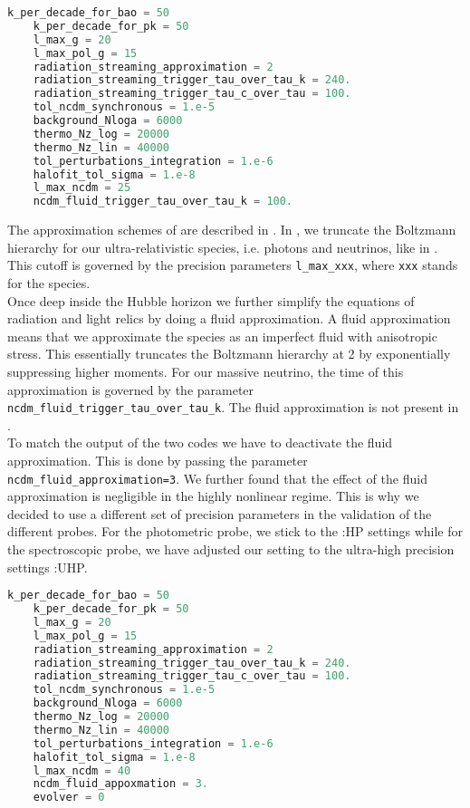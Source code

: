 \documentclass[../main.tex]{subfiles}
\begin{document}
\begin{lstlisting}[language=Python,caption=\class:HP precision settings, label=lst:classHP]
    k_per_decade_for_bao = 50
    k_per_decade_for_pk = 50
    l_max_g = 20
    l_max_pol_g = 15
    radiation_streaming_approximation = 2
    radiation_streaming_trigger_tau_over_tau_k = 240.
    radiation_streaming_trigger_tau_c_over_tau = 100.
    tol_ncdm_synchronous = 1.e-5
    background_Nloga = 6000
    thermo_Nz_log = 20000
    thermo_Nz_lin = 40000
    tol_perturbations_integration = 1.e-6
    halofit_tol_sigma = 1.e-8
    l_max_ncdm = 25
    ncdm_fluid_trigger_tau_over_tau_k = 100.
\end{lstlisting} 
 The approximation schemes of \class are described in \cite{Blas:2011rf}. In \class, we truncate the Boltzmann hierarchy for our ultra-relativistic species, i.e. photons and neutrinos, like in \camb. This cutoff is governed by the precision parameters {\tt l\_max\_xxx}, where {\tt xxx} stands for the species.\\
 Once deep inside the Hubble horizon we further simplify the equations of radiation and light relics by doing a fluid approximation. A fluid approximation means that we approximate the species as an imperfect fluid with anisotropic stress. This essentially truncates the Boltzmann hierarchy at 2 by exponentially suppressing higher moments. For our massive neutrino, the time of this approximation is governed by the parameter {\tt ncdm\_fluid\_trigger\_tau\_over\_tau\_k}.
 The fluid approximation is not present in \camb.\\
  To match the output of the two codes we have to deactivate the fluid approximation. This is done by passing the parameter {\tt ncdm\_fluid\_approximation=3}. We further found that the effect of the fluid approximation is negligible in the highly nonlinear regime. This is why we decided to use a different set of precision parameters in the validation of the different probes. For the photometric probe, we stick to the \class:HP settings while for the spectroscopic probe, we have adjusted our setting to the ultra-high precision settings \class:UHP.
 \begin{lstlisting}[language=Python,caption=\class:UHP precision settings, label=lst:classUHP]
    k_per_decade_for_bao = 50
    k_per_decade_for_pk = 50
    l_max_g = 20
    l_max_pol_g = 15
    radiation_streaming_approximation = 2
    radiation_streaming_trigger_tau_over_tau_k = 240.
    radiation_streaming_trigger_tau_c_over_tau = 100.
    tol_ncdm_synchronous = 1.e-5
    background_Nloga = 6000
    thermo_Nz_log = 20000
    thermo_Nz_lin = 40000
    tol_perturbations_integration = 1.e-6
    halofit_tol_sigma = 1.e-8
    l_max_ncdm = 40
    ncdm_fluid_appoxmation = 3.
    evolver = 0
 \end{lstlisting}
\end{document}
